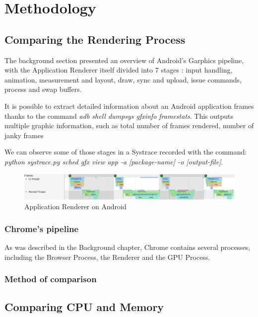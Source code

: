 \chapter{Methodology}
\section{Comparing the Rendering Process}
   
    The background section presented an overview of Android's Garphics pipeline, with the Application Renderer itself divided into 7 stages : input handling, animation, measurement and layout, draw, sync and upload, issue commands, process and swap buffers. 
    
    It is possible to extract detailed information about an Android application frames thanks to the command \textit{adb shell dumpsys gfxinfo framestats}. This outputs multiple graphic information, such as total number of frames rendered, number of janky frames
    
    We can observe some of those stages in a Systrace recorded with the command: \textit{python systrace.py sched gfx view app -a [package-name] -o [output-file]}.
    
    \begin{figure}[!ht]
        \includegraphics[width=15cm]{kththesis/Figures/android_systrace_frame.jpg}
        \caption{Application Renderer on Android}
        \label{fig:android_systrace}
    \end{figure}
    
    
    \subsection{Chrome's pipeline}
       As was described in the Background chapter, Chrome contains several processes, including the Browser Process, the Renderer and the GPU Process.
    \subsection{Method of comparison}
\section{Comparing CPU and Memory}
